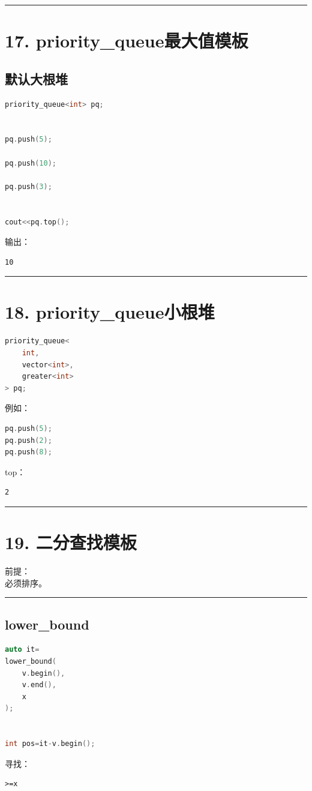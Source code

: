 \documentclass[10pt,twocolumn]{extarticle}
\begin{document}
\noindent\rule{\linewidth}{0.4pt}

\section{17. priority\_queue最大值模板}

\subsection{默认大根堆}
\begin{lstlisting}[language=C++]
priority_queue<int> pq;


pq.push(5);

pq.push(10);

pq.push(3);


cout<<pq.top();
\end{lstlisting}
输出：
\begin{lstlisting}
10
\end{lstlisting}

\noindent\rule{\linewidth}{0.4pt}

\section{18. priority\_queue小根堆}
\begin{lstlisting}[language=C++]
priority_queue<
    int,
    vector<int>,
    greater<int>
> pq;
\end{lstlisting}
例如：
\begin{lstlisting}[language=C++]
pq.push(5);
pq.push(2);
pq.push(8);
\end{lstlisting}
top：
\begin{lstlisting}
2
\end{lstlisting}

\noindent\rule{\linewidth}{0.4pt}

\section{19. 二分查找模板}

前提：\\
必须排序。

\noindent\rule{\linewidth}{0.4pt}

\subsection{lower\_bound}
\begin{lstlisting}[language=C++]
auto it=
lower_bound(
    v.begin(),
    v.end(),
    x
);


int pos=it-v.begin();
\end{lstlisting}
寻找：
\begin{lstlisting}
>=x
\end{lstlisting}
\end{document}
